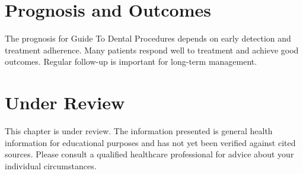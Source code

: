 \section*{Prognosis and Outcomes}
The prognosis for Guide To Dental Procedures depends on early detection and treatment adherence. Many patients respond well to treatment and achieve good outcomes. Regular follow-up is important for long-term management.
\section*{Under Review}
This chapter is under review. The information presented is general health information for educational purposes and has not yet been verified against cited sources. Please consult a qualified healthcare professional for advice about your individual circumstances.


\clearpage
